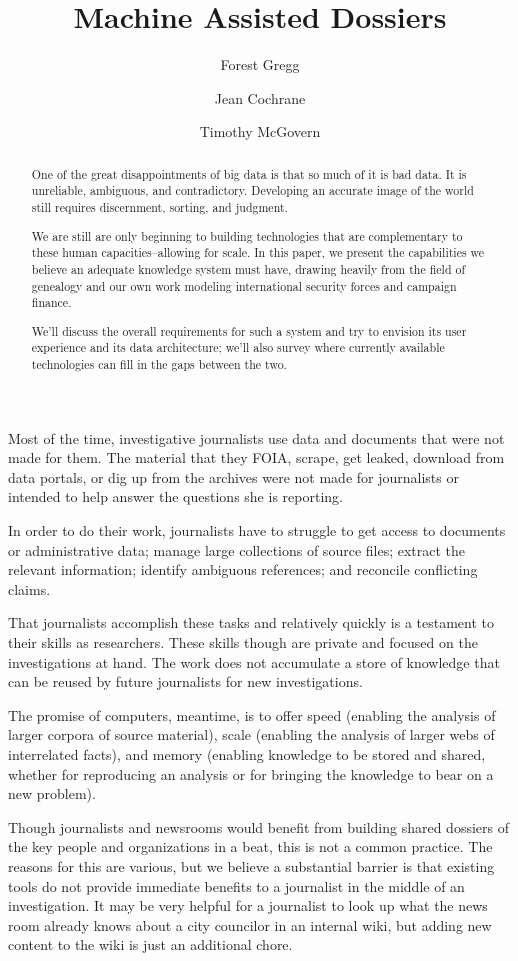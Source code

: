 \documentclass[format=siggraph, review=true]{acmart}
\title{Machine Assisted Dossiers}
\author{Forest Gregg}
\affiliation{DataMade}
\author{Jean Cochrane}
\affiliation{DataMade}
\author{Timothy McGovern}
\affiliation{O'Reilly Media}
\begin{document}
\begin{abstract}One of the great disappointments of big data is that so much
  of it is bad data. It is unreliable, ambiguous, and
  contradictory. Developing an accurate image of the world still
  requires discernment, sorting, and judgment.

  We are still are only beginning to building technologies that are
  complementary to these human capacities--allowing for
  scale.  In this paper, we present the capabilities we believe an
  adequate knowledge system must have, drawing heavily from the field
  of genealogy and our own work modeling international security forces
  and campaign finance.

  We'll discuss the overall requirements for such a system and try to envision its user experience and its data architecture; we'll also survey where currently available technologies can fill in the gaps between the two. 
\end{abstract}

\maketitle

Most of the time, investigative journalists use data and documents
that were not made for them. The material that they FOIA, scrape, get
leaked, download from data portals, or dig up from the archives
were not made for journalists or intended to help answer the
questions she is reporting.

In order to do their work, journalists have to struggle to get access
to documents or administrative data; manage large collections of
source files; extract the relevant information; identify ambiguous
references; and reconcile conflicting claims.

That journalists accomplish these tasks and relatively quickly is a
testament to their skills as researchers. These skills though are
private and focused on the investigations at hand. The work does not
accumulate a store of knowledge that can be reused by future
journalists for new investigations.

The promise of computers, meantime, is to offer speed (enabling the
analysis of larger corpora of source material), scale (enabling the
analysis of larger webs of interrelated facts), and memory (enabling
knowledge to be stored and shared, whether for reproducing an analysis
or for bringing the knowledge to bear on a new problem).

Though journalists and newsrooms would benefit from building shared
dossiers of the key people and organizations in a beat, this is not a
common practice. The reasons for this are various, but we believe a
substantial barrier is that existing tools do not provide immediate
benefits to a journalist in the middle of an investigation. It may be
very helpful for a journalist to look up what the news room already
knows about a city councilor in an internal wiki, but adding new
content to the wiki is just an additional chore. 
\end{document}
